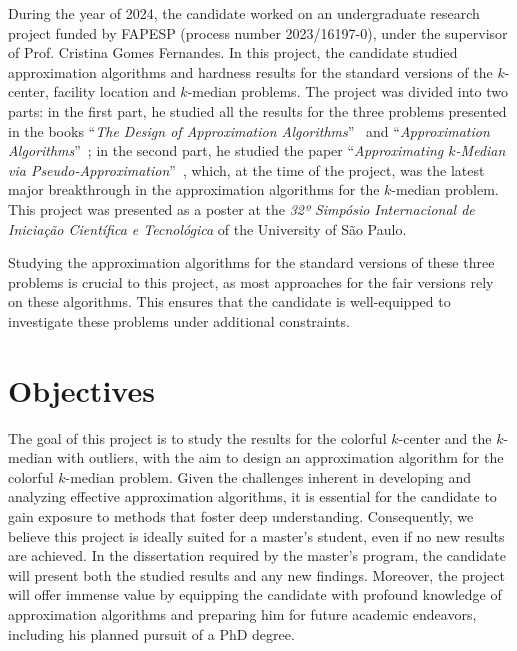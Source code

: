 \documentclass[12pt]{article}
\begin{document}
During the year of 2024, the candidate worked on an undergraduate research project funded by FAPESP (process number 2023/16197-0), under the supervisor of Prof. Cristina Gomes Fernandes.
In this project, the candidate studied approximation algorithms and hardness results for the standard versions of the $k$-center, facility location and $k$-median problems. 
The project was divided into two parts: in the first part, he studied all the results for the three problems presented in the books  ``\emph{The Design of Approximation Algorithms}''~\cite{books/WS} and ``\emph{Approximation Algorithms}''~\cite{books/Vazirani}; in the second part, he studied the paper ``\emph{Approximating $k$-Median via Pseudo-Approximation}''~\cite{LS2012}, which, at the time of the project, was the latest major breakthrough in the approximation algorithms for the $k$-median problem. 
This project was presented as a poster at the \emph{32º Simpósio Internacional de Iniciação Científica e Tecnológica} of the University of São Paulo.

Studying the approximation algorithms for the standard versions of these three problems is crucial to this project, as most approaches for the fair versions rely on these algorithms. This ensures that the candidate is well-equipped to investigate these problems under additional constraints.
\newpage

\section{Objectives}

The goal of this project is to study the results for the colorful $k$-center and the $k$-median with outliers, with the aim to design an approximation algorithm for the colorful $k$-median problem.
Given the challenges inherent in developing and analyzing effective approximation algorithms, it is essential for the candidate to gain exposure to methods that foster deep understanding. 
Consequently, we believe this project is ideally suited for a master's student, even if no new results are achieved. 
In the dissertation required by the master's program, the candidate will present both the studied results and any new findings.
Moreover, the project will offer immense value by equipping the candidate with profound knowledge of approximation algorithms and preparing him for future academic endeavors, including his planned pursuit of a PhD degree.
\end{document}
